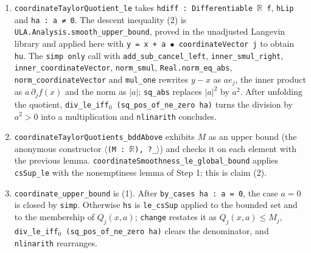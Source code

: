 \documentclass[11pt,a4paper]{report}
\begin{document}
\begin{leanbox}
\begin{enumerate}
\item \texttt{coordinate\allowbreak{}Taylor\allowbreak{}Quotient\_\allowbreak{}le} takes \texttt{hdiff : Differentiable \ensuremath{\mathbb R} f}, \texttt{h\allowbreak{}Lip} and \texttt{ha : a ≠ 0}. The descent inequality (2) is \texttt{ULA.\allowbreak{}Analysis.\allowbreak{}smooth\_\allowbreak{}upper\_\allowbreak{}bound}, proved in the unadjusted Langevin library and applied here with \texttt{y = x + a \ensuremath{\bullet} coordinate\allowbreak{}Vector j} to obtain \texttt{hu}. The \texttt{simp only} call with \texttt{add\_\allowbreak{}sub\_\allowbreak{}cancel\_\allowbreak{}left}, \texttt{inner\_\allowbreak{}smul\_\allowbreak{}right}, \texttt{inner\_\allowbreak{}coordinate\allowbreak{}Vector}, \texttt{norm\_\allowbreak{}smul}, \texttt{Real.\allowbreak{}norm\_\allowbreak{}eq\_\allowbreak{}abs}, \texttt{norm\_\allowbreak{}coordinate\allowbreak{}Vector} and \texttt{mul\_\allowbreak{}one} rewrites \(y-x\) as \(ae_j\), the inner product as \(a\,\partial_jf(x)\) and the norm as \(|a|\); \texttt{sq\_\allowbreak{}abs} replaces \(|a|^2\) by \(a^2\). After unfolding the quotient, \texttt{div\_\allowbreak{}le\_\allowbreak{}iff\ensuremath{{}_{0}} (sq\_\allowbreak{}pos\_\allowbreak{}of\_\allowbreak{}ne\_\allowbreak{}zero ha)} turns the division by \(a^2>0\) into a multiplication and \texttt{nlinarith} concludes.

\item \texttt{coordinate\allowbreak{}Taylor\allowbreak{}Quotients\_\allowbreak{}bdd\allowbreak{}Above} exhibits \(M\) as an upper bound (the anonymous constructor \texttt{\ensuremath{\langle}(M : \ensuremath{\mathbb R}), ?\_\allowbreak{}\ensuremath{\rangle}}) and checks it on each element with the previous lemma. \texttt{coordinate\allowbreak{}Smoothness\_\allowbreak{}le\_\allowbreak{}global\_\allowbreak{}bound} applies \texttt{cs\allowbreak{}Sup\_\allowbreak{}le} with the nonemptiness lemma of Step 1; this is claim (2).

\item \texttt{coordinate\_\allowbreak{}upper\_\allowbreak{}bound} is (1). After \texttt{by\_\allowbreak{}cases ha : a = 0}, the case \(a=0\) is closed by \texttt{simp}. Otherwise \texttt{hs} is \texttt{le\_\allowbreak{}cs\allowbreak{}Sup} applied to the bounded set and to the membership of \(Q_j(x,a)\); \texttt{change} restates it as \(Q_j(x,a)\le M_j\), \texttt{div\_\allowbreak{}le\_\allowbreak{}iff\ensuremath{{}_{0}} (sq\_\allowbreak{}pos\_\allowbreak{}of\_\allowbreak{}ne\_\allowbreak{}zero ha)} clears the denominator, and \texttt{nlinarith} rearranges.

\end{enumerate}
\end{leanbox}
\end{document}
